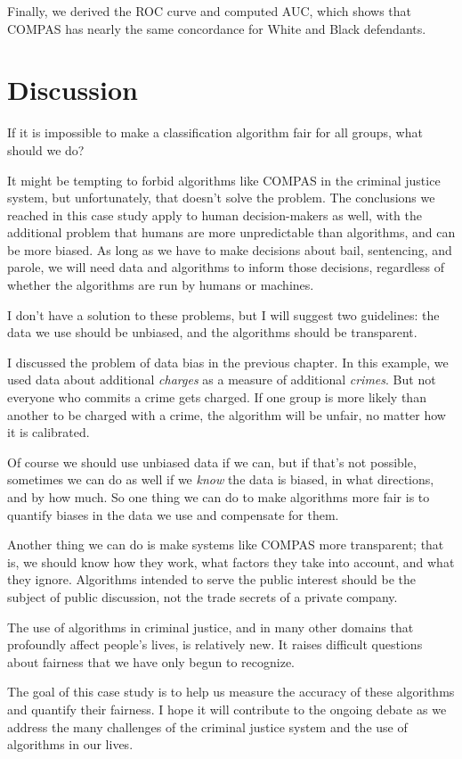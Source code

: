 Finally, we derived the ROC curve and computed AUC, which shows that
COMPAS has nearly the same concordance for White and Black defendants.

\hypertarget{discussion}{%
\section{Discussion}\label{discussion}}

If it is impossible to make a classification algorithm fair for all
groups, what should we do?

It might be tempting to forbid algorithms like COMPAS in the criminal
justice system, but unfortunately, that doesn't solve the problem. The
conclusions we reached in this case study apply to human decision-makers
as well, with the additional problem that humans are more unpredictable
than algorithms, and can be more biased. As long as we have to make
decisions about bail, sentencing, and parole, we will need data and
algorithms to inform those decisions, regardless of whether the
algorithms are run by humans or machines.

I don't have a solution to these problems, but I will suggest two
guidelines: the data we use should be unbiased, and the algorithms
should be transparent.

I discussed the problem of data bias in the previous chapter. In this
example, we used data about additional \emph{charges} as a measure of
additional \emph{crimes}. But not everyone who commits a crime gets
charged. If one group is more likely than another to be charged with a
crime, the algorithm will be unfair, no matter how it is calibrated.

Of course we should use unbiased data if we can, but if that's not
possible, sometimes we can do as well if we \emph{know} the data is
biased, in what directions, and by how much. So one thing we can do to
make algorithms more fair is to quantify biases in the data we use and
compensate for them.

Another thing we can do is make systems like COMPAS more transparent;
that is, we should know how they work, what factors they take into
account, and what they ignore. Algorithms intended to serve the public
interest should be the subject of public discussion, not the trade
secrets of a private company.

The use of algorithms in criminal justice, and in many other domains
that profoundly affect people's lives, is relatively new. It raises
difficult questions about fairness that we have only begun to recognize.

The goal of this case study is to help us measure the accuracy of these
algorithms and quantify their fairness. I hope it will contribute to the
ongoing debate as we address the many challenges of the criminal justice
system and the use of algorithms in our lives.

